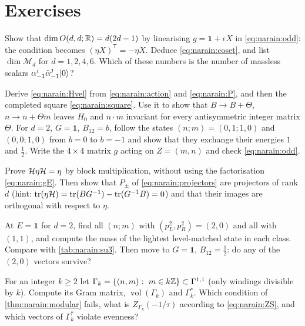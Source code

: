 \section*{Exercises}

\begin{exercise}[$\star$]
Show that $\dim O(d,d;\mathbb{R})=d(2d-1)$ by linearising $g=\mathbf 1+\epsilon X$ in
\eqref{eq:narain:odd}: the condition becomes $(\eta X)^{\mathsf T}=-\eta X$. Deduce
\eqref{eq:narain:coset}, and list $\dim\mathcal M_d$ for $d=1,2,4,6$. Which of these numbers
is the number of massless scalars $\alpha^i_{-1}\tilde\alpha^j_{-1}|0\rangle$?
\end{exercise}

\begin{exercise}[$\star$]
Derive \eqref{eq:narain:Hvel} from \eqref{eq:narain:action} and \eqref{eq:narain:P}, and then
the completed square \eqref{eq:narain:square}. Use it to show
that $B\to B+\Theta$, $n\to n+\Theta m$ leaves $H_0$ and $n\cdot m$ invariant for every
antisymmetric integer matrix $\Theta$. For $d=2$, $G=\mathbf 1$, $B_{12}=b$, follow the
states $(n;m)=(0,1;1,0)$ and $(0,0;1,0)$ from $b=0$ to $b=-1$ and show that they exchange
their energies $1$ and $\frac12$. Write the $4\times4$ matrix $g$ acting on $Z=(m,n)$ and
check \eqref{eq:narain:odd}.
\end{exercise}

\begin{exercise}[$\star\star$]
Prove $\mathcal{H}\eta\mathcal{H}=\eta$ by block multiplication, without using the factorisation
\eqref{eq:narain:gE}. Then show that $P_\pm$ of \eqref{eq:narain:projectors} are projectors
of rank $d$ (hint: $\operatorname{tr}(\eta\mathcal{H})=\operatorname{tr}(BG^{-1})-\operatorname{tr}(G^{-1}B)=0$) and that their images are
orthogonal with respect to $\eta$.
\end{exercise}

\begin{exercise}[$\star\star$]
At $E=\mathbf 1$ for $d=2$, find all $(n;m)$ with $(p_L^2,p_R^2)=(2,0)$ and all with $(1,1)$,
and compute the mass of the lightest level-matched state in each class. Compare with
\cref{tab:narain:su3}. Then move to $G=\mathbf 1$, $B_{12}=\frac12$: do any of the $(2,0)$
vectors survive?
\end{exercise}

\begin{exercise}[$\star\star$]
For an integer $k\ge2$ let $\Gamma_k=\{(n,m):\ m\in k\mathbb{Z}\}\subset\Gamma^{1,1}$ (only
windings divisible by $k$). Compute its Gram matrix, $\operatorname{vol}(\Gamma_k)$ and
$\Gamma_k^*$. Which condition of \cref{thm:narain:modular} fails, what is
$Z_{\Gamma_k}(-1/\tau)$ according to \eqref{eq:narain:ZS}, and which vectors of $\Gamma_k^*$
violate evenness?
\end{exercise}

